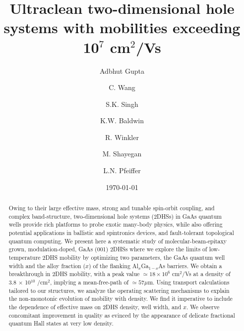 \documentclass[reprint,amsmath,amssymb,aps,prl,nobibnotes,superscriptaddress]{revtex4-1}
\begin{document}
\title{Ultraclean two-dimensional hole systems with mobilities exceeding 10$^7$ cm$^2$/Vs}

\author{Adbhut Gupta}
\author{C. Wang}
\author{S.K. Singh}
\author{K.W. Baldwin}
\author{R. Winkler}
\author{M. Shayegan}
\author{L.N. Pfeiffer}
\date{\today}
\begin{abstract}

Owing to their large effective mass, strong and tunable spin-orbit coupling, and complex band-structure, two-dimensional hole systems (2DHSs) in GaAs quantum wells provide rich platforms to probe exotic many-body physics, while also offering potential applications in ballistic and spintronics devices, and fault-tolerant topological quantum computing. We present here a systematic study of molecular-beam-epitaxy grown, modulation-doped, GaAs (001) 2DHSs where we explore the limits of low-temperature 2DHS mobility by optimizing two parameters, the GaAs quantum well width and the alloy fraction ($x$) of the flanking Al$_x$Ga$_{1-x}$As barriers. We obtain a breakthrough in 2DHS mobility, with a peak value $\simeq 18 \times 10^6$ cm$^2$/Vs at a density of 3.8 $\times$ 10$^{10}$ /cm$^{2}$, implying a mean-free-path of $\simeq 57 \mu$m. Using transport calculations tailored to our structures, we analyze the operating scattering mechanisms to explain the non-monotonic evolution of mobility with density. We find it imperative to include the dependence of effective mass on 2DHS density, well width, and $x$. We observe concomitant improvement in quality as evinced by the appearance of delicate fractional quantum Hall states at very low density.
\end{abstract}
\maketitle
\end{document}
